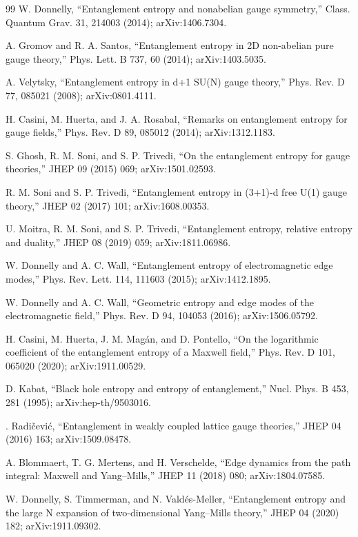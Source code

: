 \documentclass[11pt]{article}
\theoremstyle{remark}
\theoremstyle{plain}
\begin{document}
\begin{thebibliography}{99}
 W. Donnelly, ``Entanglement entropy and nonabelian gauge symmetry,'' Class. Quantum Grav. 31, 214003 (2014); arXiv:1406.7304.

 A. Gromov and R. A. Santos, ``Entanglement entropy in 2D non-abelian pure gauge theory,'' Phys. Lett. B 737, 60 (2014); arXiv:1403.5035.

 A. Velytsky, ``Entanglement entropy in d+1 SU(N) gauge theory,'' Phys. Rev. D 77, 085021 (2008); arXiv:0801.4111.

 H. Casini, M. Huerta, and J. A. Rosabal, ``Remarks on entanglement entropy for gauge fields,'' Phys. Rev. D 89, 085012 (2014); arXiv:1312.1183.

 S. Ghosh, R. M. Soni, and S. P. Trivedi, ``On the entanglement entropy for gauge theories,'' JHEP 09 (2015) 069; arXiv:1501.02593.

 R. M. Soni and S. P. Trivedi, ``Entanglement entropy in (3+1)-d free U(1) gauge theory,'' JHEP 02 (2017) 101; arXiv:1608.00353.

 U. Moitra, R. M. Soni, and S. P. Trivedi, ``Entanglement entropy, relative entropy and duality,'' JHEP 08 (2019) 059; arXiv:1811.06986.

 W. Donnelly and A. C. Wall, ``Entanglement entropy of electromagnetic edge modes,'' Phys. Rev. Lett. 114, 111603 (2015); arXiv:1412.1895.

 W. Donnelly and A. C. Wall, ``Geometric entropy and edge modes of the electromagnetic field,'' Phys. Rev. D 94, 104053 (2016); arXiv:1506.05792.

 H. Casini, M. Huerta, J. M. Mag\'an, and D. Pontello, ``On the logarithmic coefficient of the entanglement entropy of a Maxwell field,'' Phys. Rev. D 101, 065020 (2020); arXiv:1911.00529.

 D. Kabat, ``Black hole entropy and entropy of entanglement,'' Nucl. Phys. B 453, 281 (1995); arXiv:hep-th/9503016.

 \DJ. Radi\v{c}evi\'c, ``Entanglement in weakly coupled lattice gauge theories,'' JHEP 04 (2016) 163; arXiv:1509.08478.

 A. Blommaert, T. G. Mertens, and H. Verschelde, ``Edge dynamics from the path integral: Maxwell and Yang--Mills,'' JHEP 11 (2018) 080; arXiv:1804.07585.

 W. Donnelly, S. Timmerman, and N. Vald\'es-Meller, ``Entanglement entropy and the large N expansion of two-dimensional Yang--Mills theory,'' JHEP 04 (2020) 182; arXiv:1911.09302.


\end{thebibliography}
\end{document}
